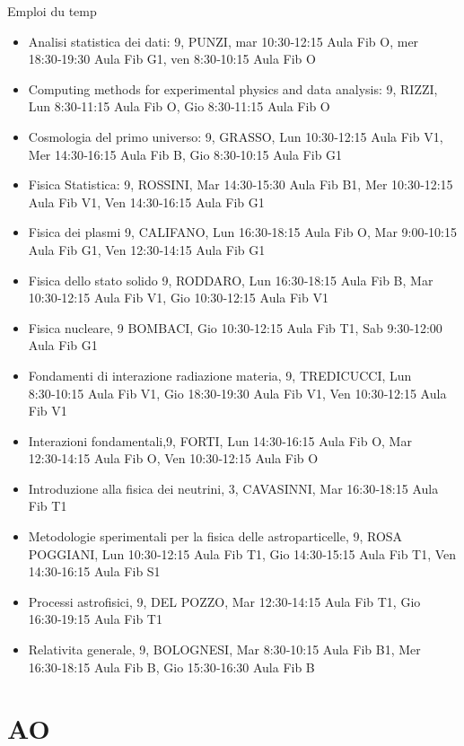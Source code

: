 \documentclass[10pt,xcolor={usenames},fleqn,mathserif,serif]{beamer}
\begin{document}
\begin{frame}[label={why},allowframebreaks]{Emploi du temp}
\begin{itemize}
\item Analisi statistica dei dati: 9, PUNZI, mar 10:30‑12:15 Aula Fib O, mer 18:30‑19:30 Aula Fib G1, ven 8:30‑10:15 Aula Fib O
\item Computing methods for experimental physics and data analysis: 9, RIZZI, Lun 8:30‑11:15 Aula Fib O, Gio 8:30‑11:15 Aula Fib O
\item Cosmologia del primo universo: 9, GRASSO, Lun 10:30‑12:15 Aula Fib V1, Mer 14:30‑16:15 Aula Fib B, Gio 8:30‑10:15 Aula Fib G1
\item Fisica Statistica: 9, ROSSINI, Mar 14:30‑15:30 Aula Fib B1, Mer 10:30‑12:15 Aula Fib V1, Ven 14:30‑16:15 Aula Fib G1
\item Fisica dei plasmi	9, CALIFANO, Lun 16:30‑18:15 Aula Fib O, Mar 9:00‑10:15 Aula Fib G1, Ven 12:30‑14:15 Aula Fib G1
\item Fisica dello stato solido	9, RODDARO, Lun 16:30‑18:15 Aula Fib B, Mar 10:30‑12:15 Aula Fib V1, Gio 10:30‑12:15 Aula Fib V1
\item Fisica nucleare, 9 BOMBACI, Gio 10:30‑12:15 Aula Fib T1, Sab 9:30‑12:00 Aula Fib G1
\item Fondamenti di interazione radiazione materia, 9, TREDICUCCI, Lun 8:30‑10:15 Aula Fib V1, Gio 18:30‑19:30 Aula Fib V1, Ven 10:30‑12:15 Aula Fib V1
\item Interazioni fondamentali,9, FORTI, Lun 14:30‑16:15 Aula Fib O, Mar 12:30‑14:15 Aula Fib O, Ven 10:30‑12:15 Aula Fib O
\item Introduzione alla fisica dei neutrini, 3, CAVASINNI, Mar 16:30‑18:15 Aula Fib T1
\item Metodologie sperimentali per la fisica delle astroparticelle, 9, ROSA POGGIANI, Lun 10:30‑12:15 Aula Fib T1, Gio 14:30‑15:15 Aula Fib T1, Ven 14:30‑16:15 Aula Fib S1
\item Processi astrofisici, 9, DEL POZZO, Mar 12:30‑14:15 Aula Fib T1, Gio 16:30‑19:15 Aula Fib T1
\item Relativita generale, 9, BOLOGNESI, Mar 8:30‑10:15 Aula Fib B1, Mer 16:30‑18:15 Aula Fib B, Gio 15:30‑16:30 Aula Fib B
\end{itemize}
\end{frame}

\section{AO}
\end{document}
